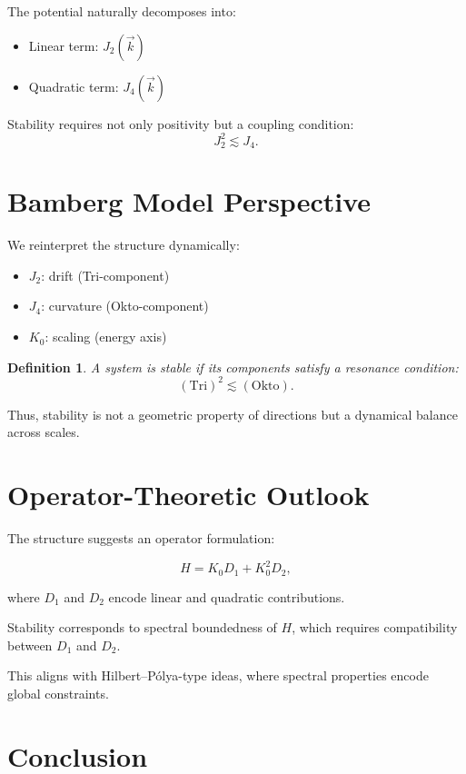 \documentclass[11pt,a4paper]{article}
\newtheorem{definition}{Definition}[section]
\begin{document}
	The potential naturally decomposes into:
	\begin{itemize}
		\item Linear term: $J_2(\vec{k})$
		\item Quadratic term: $J_4(\vec{k})$
	\end{itemize}
	
	Stability requires not only positivity but a coupling condition:
	\[
	J_2^2 \lesssim J_4.
	\]
	
	\section{Bamberg Model Perspective}
	
	We reinterpret the structure dynamically:
	
	\begin{itemize}
		\item $J_2$: drift (Tri-component)
		\item $J_4$: curvature (Okto-component)
		\item $K_0$: scaling (energy axis)
	\end{itemize}
	
	\begin{definition}
		A system is stable if its components satisfy a resonance condition:
		\[
		(\text{Tri})^2 \lesssim (\text{Okto}).
		\]
	\end{definition}
	
	Thus, stability is not a geometric property of directions but a dynamical balance across scales.
	
	\section{Operator-Theoretic Outlook}
	
	The structure suggests an operator formulation:
	
	\begin{equation}
		H = K_0 D_1 + K_0^2 D_2,
	\end{equation}
	
	where $D_1$ and $D_2$ encode linear and quadratic contributions.
	
	Stability corresponds to spectral boundedness of $H$, which requires compatibility between $D_1$ and $D_2$.
	
	This aligns with Hilbert--Pólya-type ideas, where spectral properties encode global constraints.
	
	\section{Conclusion}
	
\end{document}
